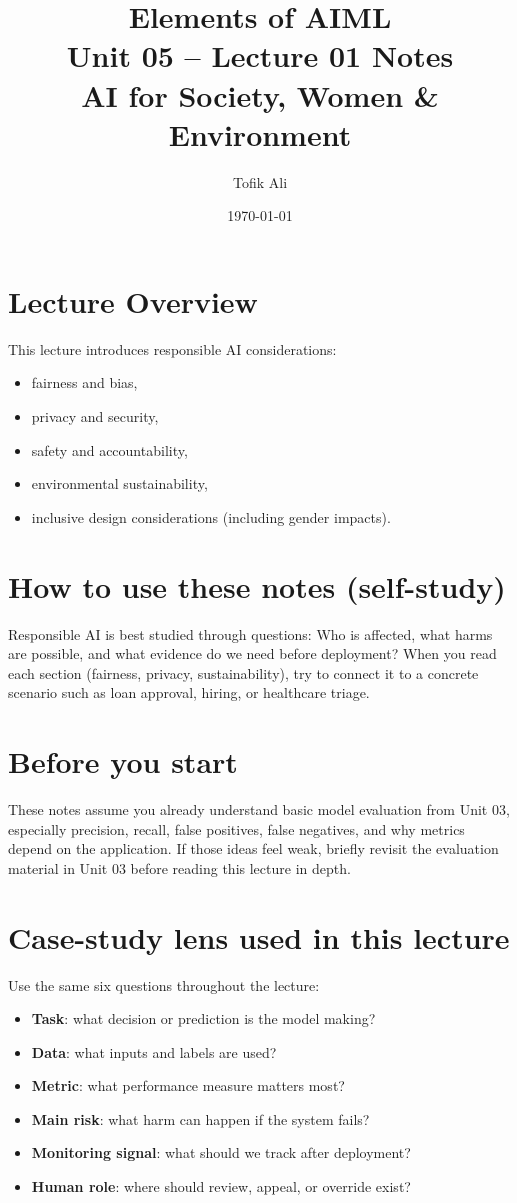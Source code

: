 \documentclass[11pt]{article}
\title{Elements of AIML\\Unit 05 -- Lecture 01 Notes\\AI for Society, Women \& Environment}
\author{Tofik Ali}
\date{\today}
\begin{document}
\maketitle
\tableofcontents

\section{Lecture Overview}
This lecture introduces responsible AI considerations:
\begin{itemize}[leftmargin=*]
  \item fairness and bias,
  \item privacy and security,
  \item safety and accountability,
  \item environmental sustainability,
  \item inclusive design considerations (including gender impacts).
\end{itemize}
\notesources{\AIMLUnitVSources}

\section{How to use these notes (self-study)}
Responsible AI is best studied through questions:
Who is affected, what harms are possible, and what evidence do we need before deployment?
When you read each section (fairness, privacy, sustainability), try to connect it to a concrete scenario such as loan approval, hiring, or healthcare triage.

\section{Before you start}
These notes assume you already understand basic model evaluation from Unit 03, especially precision, recall, false positives, false negatives, and why metrics depend on the application.
If those ideas feel weak, briefly revisit the evaluation material in Unit 03 before reading this lecture in depth.

\section{Case-study lens used in this lecture}
Use the same six questions throughout the lecture:
\begin{itemize}[leftmargin=*]
  \item \textbf{Task}: what decision or prediction is the model making?
  \item \textbf{Data}: what inputs and labels are used?
  \item \textbf{Metric}: what performance measure matters most?
  \item \textbf{Main risk}: what harm can happen if the system fails?
  \item \textbf{Monitoring signal}: what should we track after deployment?
  \item \textbf{Human role}: where should review, appeal, or override exist?
\end{itemize}
\end{document}
